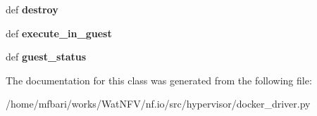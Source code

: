 \begin{DoxyCompactItemize}
\item 
\hypertarget{classhypervisor_1_1docker__driver_1_1Docker_a2ec2d8fe9b9e41e66e5939dd5440ecac}{def {\bfseries destroy}}\label{classhypervisor_1_1docker__driver_1_1Docker_a2ec2d8fe9b9e41e66e5939dd5440ecac}

\item 
\hypertarget{classhypervisor_1_1docker__driver_1_1Docker_a59d42532a812e640504eb6dad7741049}{def {\bfseries execute\-\_\-in\-\_\-guest}}\label{classhypervisor_1_1docker__driver_1_1Docker_a59d42532a812e640504eb6dad7741049}

\item 
\hypertarget{classhypervisor_1_1docker__driver_1_1Docker_ab81c6c5254944c666356f27cfa82dd55}{def {\bfseries guest\-\_\-status}}\label{classhypervisor_1_1docker__driver_1_1Docker_ab81c6c5254944c666356f27cfa82dd55}

\end{DoxyCompactItemize}


The documentation for this class was generated from the following file\-:\begin{DoxyCompactItemize}
\item 
/home/mfbari/works/\-Wat\-N\-F\-V/nf.\-io/src/hypervisor/docker\-\_\-driver.\-py\end{DoxyCompactItemize}
